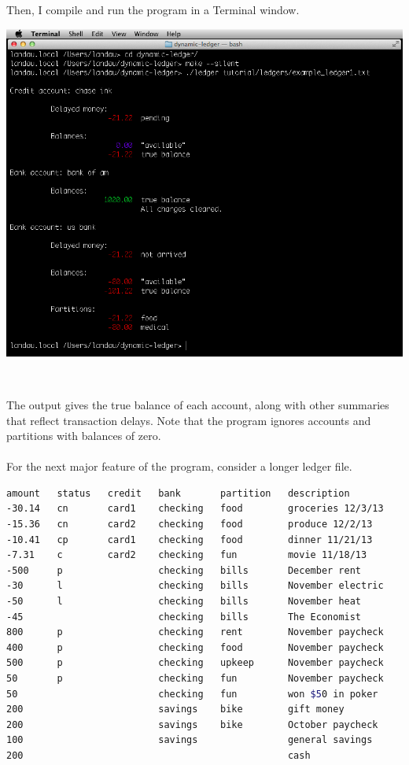 \documentclass{article}
\providecommand{\q}{$\quad$ \newline}
\begin{document}
\begin{flushleft}
Then, I compile and run the program in a Terminal window. \q

\begin{center}
\includegraphics[scale=.5]{fig/open3.png}
\end{center} \q

The output gives the true balance of each account, along with other summaries that reflect transaction delays. Note that the program ignores accounts and partitions with balances of zero. 


\paragraph{} For the next major feature of the program, consider a longer ledger file.

\begin{lstlisting}[language=bash, title = example\_ledger2.txt]
amount   status   credit   bank       partition   description
-30.14   cn       card1    checking   food        groceries 12/3/13
-15.36   cn       card2    checking   food        produce 12/2/13
-10.41   cp       card1    checking   food        dinner 11/21/13
-7.31    c        card2    checking   fun         movie 11/18/13
-500     p                 checking   bills       December rent
-30      l                 checking   bills       November electric
-50      l                 checking   bills       November heat
-45                        checking   bills       The Economist
800      p                 checking   rent        November paycheck		
400      p                 checking   food        November paycheck	
500      p                 checking   upkeep      November paycheck		
50       p                 checking   fun         November paycheck	
50                         checking   fun         won $50 in poker		
200                        savings    bike        gift money
200                        savings    bike        October paycheck
100                        savings                general savings
200                                               cash
\end{lstlisting}  \q


\end{flushleft}
\end{document}
